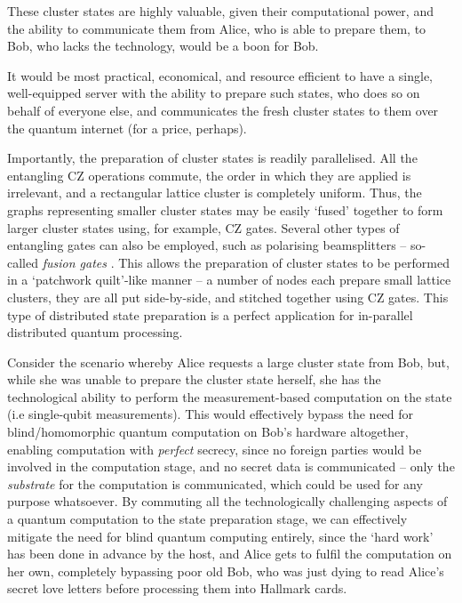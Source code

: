 \documentclass[aps, rmp, twocolumn, amsmath, amssymb, nofootinbib, superscriptaddress, longbibliography, floatfix, table-of-contents, eqsecnum]{revtex4-1}
\begin{document}
These cluster states are highly valuable, given their computational power, and the ability to communicate them from Alice, who is able to prepare them, to Bob, who lacks the technology, would be a boon for Bob.

It would be most practical, economical, and resource efficient to have a single, well-equipped server with the ability to prepare such states, who does so on behalf of everyone else, and communicates the fresh cluster states to them over the quantum internet (for a price, perhaps).

Importantly, the preparation of cluster states is readily parallelised. All the entangling CZ operations commute, the order in which they are applied is irrelevant, and a rectangular lattice cluster is completely uniform. Thus, the graphs representing smaller cluster states may be easily `fused' together to form larger cluster states using, for example, CZ gates. Several other types of entangling gates can also be employed, such as polarising beamsplitters -- so-called \textit{fusion gates} \cite{bib:BrowneRudolph05}. This allows the preparation of cluster states to be performed in a `patchwork quilt'-like manner -- a number of nodes each prepare small lattice clusters, they are all put side-by-side, and stitched together using CZ gates. This type of distributed state preparation is a perfect application for in-parallel distributed quantum processing.

Consider the scenario whereby Alice requests a large cluster state from Bob, but, while she was unable to prepare the cluster state herself, she has the technological ability to perform the measurement-based computation on the state (i.e single-qubit measurements). This would effectively bypass the need for blind/homomorphic quantum computation on Bob's hardware altogether, enabling computation with \textit{perfect} secrecy, since no foreign parties would be involved in the computation stage, and no secret data is communicated -- only the \textit{substrate} for the computation is communicated, which could be used for any purpose whatsoever. By commuting all the technologically challenging aspects of a quantum computation to the state preparation stage, we can effectively mitigate the need for blind quantum computing entirely, since the `hard work' has been done in advance by the host, and Alice gets to fulfil the computation on her own, completely bypassing poor old Bob, who was just dying to read Alice's secret love letters before processing them into Hallmark cards.
\end{document}
